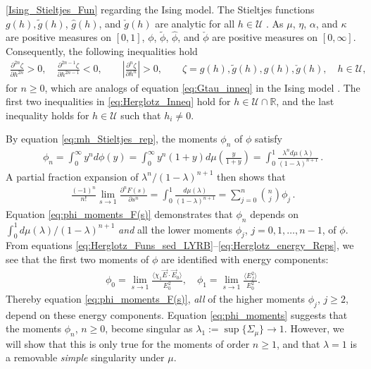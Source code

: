 \documentclass[english,12pt,jmp,graphicx]{revtex4-1}
\newcommand{\ph}{\hat{\phi}}
\begin{document}
\eqref{Ising_Stieltjes_Fun} regarding the Ising model. The Stieltjes
functions $g(h),\tilde{g}(h)$, $\hat{g}(h)$, and $\check{g}(h)$ are
analytic for all $h\in\mathcal{U}$ \cite{Golden:CMP-473}.  As $\mu$, $\eta$,
$\alpha$, and $\kappa$ are positive measures on $[0,1]$, $\phi$, $\tilde{\phi}$,
$\ph$, and $\check{\phi}$ are positive measures on $[0,\infty]$. Consequently,
the following inequalities hold 
%
\begin{align}\label{eq:Herglotz_Inneq}
  \frac{\partial^{2n}\zeta}{\partial h^{2n}}>0, \quad
  \frac{\partial^{2n-1}\zeta}{\partial h^{2n-1}}<0, \qquad
  \left|\frac{\partial^n\zeta}{\partial h^n}\right|>0, \qquad
  \zeta=g(h),\tilde{g}(h),\hat{g}(h),\check{g}(h), \quad h\in\mathcal{U},
\end{align}
%
for $n\geq0$, which are analogs of equation \eqref{eq:Gtau_inneq} in the
Ising model \cite{Golden:JMP-5627}. The first two inequalities in
\eqref{eq:Herglotz_Inneq} hold for $h\in\mathcal{U}\cap\mathbb{R}$, and the
last inequality holds for $h\in\mathcal{U}$ such that $h_i\neq0$. 

By equation \eqref{eq:mh_Stieltjes_rep}, the moments $\phi_n$ of $\phi$
satisfy  
%
\begin{align}\label{eq:phi_moments}
  \phi_n=\int_0^\infty y^nd\phi(y)
    =\int_0^\infty y^n(1+y)d\mu\left(\frac{y}{1+y}\right)
    =\int_0^1\frac{\lambda^nd\mu(\lambda)}{(1-\lambda)^{n+1}}\,.
\end{align}
%
A partial fraction expansion of $\lambda^n/(1-\lambda)^{n+1}$ then shows that
%
\begin{align}\label{eq:phi_moments_F(s)}
  \frac{(-1)^n}{n!}\lim_{s\to1}\frac{\partial^nF(s)}{\partial s^n}=\int_0^1\frac{d\mu(\lambda)}{(1-\lambda)^{n+1}}
                                =\sum_{j=0}^n{n \choose j} \phi_j\,.
\end{align}
%
Equation \eqref{eq:phi_moments_F(s)} demonstrates that $\phi_n$ depends
on $\int_0^1d\mu(\lambda)/(1-\lambda)^{n+1}$ \emph{and} all the lower moments $\phi_j$,
$j=0,1,\ldots,n-1$, of $\phi$. From equations 
\eqref{eq:Herglotz_Funs_sed_LYRB}--\eqref{eq:Herglotz_energy_Reps}, we  
see that the first two moments of $\phi$ are identified with energy
components:     
%
\begin{align}\label{eq:phi_energy_relations}
  \phi_0=\lim_{s\to1}\frac{\langle\chi_1\vec{E}\cdot\vec{E}_0\rangle}{E_0^2},   \quad
  \phi_1=\lim_{s\to1}\frac{\langle E_f^2\rangle}{E_0^2}.
\end{align}
%
Thereby equation \eqref{eq:phi_moments_F(s)}, \emph{all} of the higher
moments $\phi_j$, $j\geq2$, depend on these energy components. Equation
\eqref{eq:phi_moments} suggests that the moments $\phi_n$, $n\geq0$, become
singular as $\lambda_1:=\sup\{\Sigma_\mu\}\to1$. However, we will show that this is only
true for the moments of order $n\geq1$, and that $\lambda=1$ is a removable
\emph{simple} singularity under $\mu$. 
\end{document}
